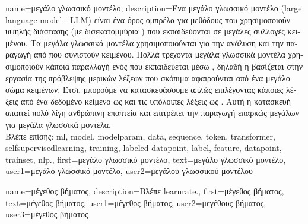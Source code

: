 {name={\foreignlanguage{greek}{μεγάλο γλωσσικό μοντέλο}},
	description={\foreignlanguage{greek}{Ένα μεγάλο γλωσσικό μοντέλο} 
		(large language model - LLM) \foreignlanguage{greek}{είναι ένα όρος-ομπρέλα για μεθόδους}  
		\foreignlanguage{greek}{που χρησιμοποιούν}   \foreignlanguage{greek}{υψηλής 
		διάστασης (με δισεκατομμύρια} ) \foreignlanguage{greek}{που εκπαιδεύονται σε μεγάλες 
		συλλογές}  \foreignlanguage{greek}{κειμένου. Τα μεγάλα γλωσσικά μοντέλα χρησιμοποιούνται 
		για την ανάλυση και την παραγωγή}  \foreignlanguage{greek}{από}  
		\foreignlanguage{greek}{που συνιστούν}  \foreignlanguage{greek}{κειμένου}. 
		\foreignlanguage{greek}{Πολλά τρέχοντα μεγάλα γλωσσικά μοντέλα χρησιμοποιούν κάποια παραλλαγή ενός} 
		 \foreignlanguage{greek}{που εκπαιδεύεται μέσω} , 
		\foreignlanguage{greek}{δηλαδή η}  \foreignlanguage{greek}{βασίζεται στην εργασία της 
		πρόβλεψης μερικών λέξεων που σκόπιμα αφαιρούνται από ένα μεγάλο σώμα κειμένων. Έτσι, μπορούμε να 
		κατασκευάσουμε}  \foreignlanguage{greek}{απλώς επιλέγοντας κάποιες λέξεις 
		από ένα δεδομένο κείμενο ως}  \foreignlanguage{greek}{και τις υπόλοιπες λέξεις ως} 
		 . \foreignlanguage{greek}{Αυτή η κατασκευή απαιτεί 
		πολύ λίγη ανθρώπινη εποπτεία και επιτρέπει την παραγωγή επαρκώς 
		μεγάλων}  \foreignlanguage{greek}{για μεγάλα γλωσσικά μοντέλα.} 
		\\
		\foreignlanguage{greek}{Βλέπε επίσης:} \gls{ml}, \gls{model}, \gls{modelparam}, \gls{data}, \gls{sequence}, \gls{token}, 
		\gls{transformer}, \gls{selfsupervisedlearning}, \gls{training}, \gls{labeled datapoint}, \gls{label}, \gls{feature}, \gls{datapoint}, 
		\gls{trainset}, \gls{nlp}.},
	first={\foreignlanguage{greek}{μεγάλο γλωσσικό μοντέλο}},
	text={\foreignlanguage{greek}{μεγάλο γλωσσικό μοντέλο}},
	user1={\foreignlanguage{greek}{μεγάλο γλωσσικό μοντέλο}}, %
	user2={\foreignlanguage{greek}{μεγάλου γλωσσικού μοντέλου}} %
}

{name={\foreignlanguage{greek}{μέγεθος βήματος}}, 
	description={\foreignlanguage{greek}{Βλέπε} \gls{learnrate}.}, 
	first={\foreignlanguage{greek}{μέγεθος βήματος}},
	text={\foreignlanguage{greek}{μέγεθος βήματος}},
	user1={\foreignlanguage{greek}{μέγεθος βήματος}}, %
  	user2={\foreignlanguage{greek}{μεγέθους βήματος}}, %
	user3={\foreignlanguage{greek}{μέγεθος βήματος}} %
}

